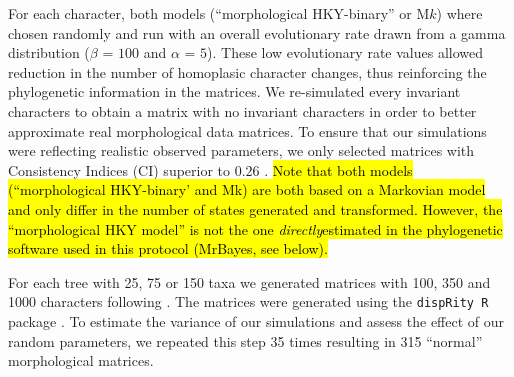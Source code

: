 \documentclass[12pt,letterpaper]{article}
\begin{document}
\noindent For each character, both models (``morphological HKY-binary'' or M$k$) where chosen randomly and run with an overall evolutionary rate drawn from a gamma distribution ($\beta$ = $100$ and $\alpha$ = $5$).
These low evolutionary rate values allowed reduction in the number of homoplasic character changes, thus reinforcing the phylogenetic information in the matrices.
We re-simulated every invariant characters to obtain a matrix with no invariant characters in order to better approximate real morphological data matrices.
To ensure that our simulations were reflecting realistic observed parameters, we only selected matrices with Consistency Indices (CI) superior to $0.26$ \citep{sanderson1989patterns,OReilly20160081}.
\hl{Note that both models (``morphological HKY-binary' and Mk) are both based on a Markovian model and only differ in the number of states generated and transformed.
However, the ``morphological HKY model'' is not the one \textit{directly}estimated in the phylogenetic software used in this protocol (MrBayes, see below).}


For each tree with 25, 75 or 150 taxa we generated matrices with 100, 350 and 1000 characters following \cite{OReilly20160081}.
The matrices were generated using the \texttt{dispRity R} package \citep{thomas_guillerme_2016_55646}.
To estimate the variance of our simulations and assess the effect of our random parameters, we repeated this step 35 times resulting in 315 ``normal'' morphological matrices.
\end{document}

